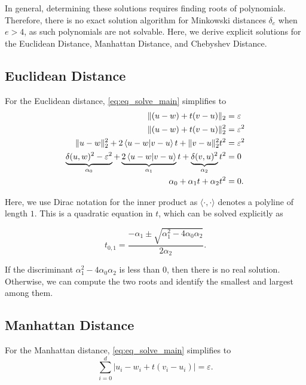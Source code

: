 In general, determining these solutions requires finding roots of polynomials. Therefore, there is no exact solution algorithm for Minkowski distances \(\delta_e\) when \(e > 4\), as such polynomials are not solvable. Here, we derive explicit solutions for the Euclidean Distance, Manhattan Distance, and Chebyshev Distance. 

\subsection{Euclidean Distance}
\label{subsubsec:eq_euclidean_distance}
For the Euclidean distance, \cref{eq:eq_solve_main} simplifies to 
\begin{align*}
  \| (u - w) + t(v - u) \|_2 &= \varepsilon \\
  \| (u - w) + t(v - u) \|_2^2 &= \varepsilon^2 \\
  \| u - w \|_2^2 + 2\braket{u - w | v - u} t  +  \| v - u \|_2^2 t^2 &= \varepsilon^2 \\
  \underbrace{\delta(u,w)^2 - \varepsilon^2}_{\alpha_0} + \underbrace{2\braket{u - w | v - u} }_{\alpha_1}t  +  \underbrace{\delta(v, u)^2}_{\alpha_2} t^2 &= 0 \\
  \alpha_0 + \alpha_1 t  + \alpha_2 t^2 &= 0.
\end{align*}

Here, we use Dirac notation for the inner product as \(\langle \cdot , \cdot \rangle\) denotes a polyline of length \(1\).
This is a quadratic equation in \(t\), which can be solved explicitly as 

\begin{equation}
  t_{0,1} = \frac{-\alpha_1 \pm \sqrt{\alpha_1^2 - 4\alpha_0\alpha_2}}{2\alpha_2}.\label{eq:sol_explicit_euclidean}
\end{equation}

If the discriminant \(\alpha_1^2 - 4\alpha_0\alpha_2\) is less than \(0\), then there is no real solution. Otherwise, we can compute the two roots and identify the smallest and largest among them. 


\subsection{Manhattan Distance}
\label{subsubsec:eq_manhattan_distance}
For the Manhattan distance, \cref{eq:eq_solve_main} simplifies to 
\begin{equation}
  \sum_{i=0}^d |u_i - w_i + t (v_i - u_i)| = \varepsilon. \label{eq:solve_manhattan}
\end{equation}

